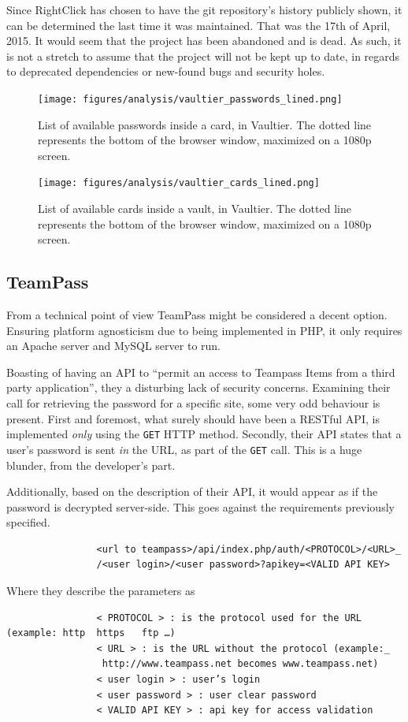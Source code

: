 			Since RightClick has chosen to have the git repository's history publicly shown, it can be determined the last time it was maintained. That was the 17th of April, 2015\cite{vaultier_history}. It would seem that the project has been abandoned and is dead. As such, it is not a stretch to assume that the project will not be kept up to date, in regards to deprecated dependencies or new-found bugs and security holes.



			\begin{figure}[htbp]
				\centering
				\texttt{[image: figures/analysis/vaultier\_passwords\_lined.png]}
				\caption{List of available passwords inside a card, in Vaultier. The dotted line represents the bottom of the browser window, maximized on a 1080p screen.}
				\label{fig:vaultier_passwords}
			\end{figure}
			\begin{figure}[htbp]
				\centering
				\texttt{[image: figures/analysis/vaultier\_cards\_lined.png]}
				\caption{List of available cards inside a vault, in Vaultier. The dotted line represents the bottom of the browser window, maximized on a 1080p screen.}
				\label{fig:vaultier_cards}
			\end{figure}

		\subsection*{TeamPass}
			From a technical point of view TeamPass might be considered a decent option. Ensuring platform agnosticism due to being implemented in PHP, it only requires an Apache server and MySQL server to run. 

			Boasting of having an API to ``permit an access to Teampass Items from a third party application'', they a disturbing lack of security concerns. Examining their call for retrieving the password for a specific site, some very odd behaviour is present. First and foremost, what surely should have been a RESTful API, is implemented \emph{only} using the \verb=GET= HTTP method. Secondly, their API states that a user's password is sent \emph{in} the URL, as part of the \verb=GET= call. This is a huge blunder, from the developer's part. 

			Additionally, based on the description of their API, it would appear as if the password is decrypted server-side. This goes against the requirements previously specified.
			\begin{verbatim}
				<url to teampass>/api/index.php/auth/<PROTOCOL>/<URL>_
				/<user login>/<user password>?apikey=<VALID API KEY>
			\end{verbatim}
			Where they describe the parameters as
			\begin{verbatim}
				< PROTOCOL > : is the protocol used for the URL (example: http	https	ftp	…)
				< URL > : is the URL without the protocol (example:_
				 http://www.teampass.net becomes www.teampass.net)
				< user login > : user’s login
				< user password > : user clear password
				< VALID API KEY > : api key for access validation
			\end{verbatim}

